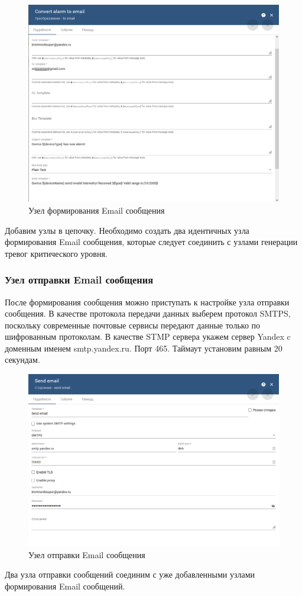 \documentclass[a4paper,14pt]{extarticle}
\begin{document}
 
\begin{figure}[h!]
	\centering
	\includegraphics[width=1\linewidth]{images/to-email-params}
	\caption{Узел формирования Email сообщения}
	\label{fig:to-email-params}
\end{figure}

Добавим узлы в цепочку. Необходимо создать два идентичных узла формирования Email сообщения, которые следует соединить с узлами генерации тревог критического уровня.



\subsubsection*{Узел отправки Email сообщения}
\label{sec:send-email}
После формирования сообщения можно приступать к настройке узла отправки сообщения. В качестве протокола передачи данных выберем протокол SMTPS, поскольку
современные почтовые сервисы передают данные только по шифрованным протоколам.
В качестве STMP сервера укажем сервер Yandex c доменным именем smtp.yandex.ru. Порт 465. Таймаут установим равным 20 секундам.

\begin{figure}[h!]
	\centering
	\includegraphics[width=0.83\linewidth]{images/send-email-params}
	\caption{Узел отправки Email сообщения}
	\label{fig:send-email-params}
\end{figure}
Два узла отправки сообщений соединим с уже добавленными узлами формирования Email сообщений.
\end{document}
